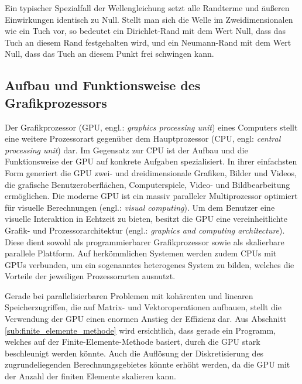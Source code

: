 \documentclass[crop=false]{standalone}
\begin{document}
        Ein typischer Spezialfall der Wellengleichung setzt alle Randterme und äußeren Einwirkungen identisch zu Null.
        Stellt man sich die Welle im Zweidimensionalen wie ein Tuch vor, so bedeutet ein Dirichlet-Rand mit dem Wert Null, dass das Tuch an diesem Rand festgehalten wird, und ein Neumann-Rand mit dem Wert Null, dass das Tuch an diesem Punkt frei schwingen kann.


    \subsection{Aufbau und Funktionsweise des Grafikprozessors} %
    \label{sub:aufbau_und_funktionsweise_des_grafikprozessors}
      Der Grafikprozessor (GPU, engl.: \textit{graphics processing unit}) eines Computers stellt eine weitere Prozessorart gegenüber dem Hauptprozessor (CPU, engl: \textit{central processing unit}) dar.
      Im Gegensatz zur CPU ist der Aufbau und die Funktionsweise der GPU auf konkrete Aufgaben spezialisiert.
      In ihrer einfachsten Form generiert die GPU zwei- und dreidimensionale Grafiken, Bilder und Videos, die grafische Benutzeroberflächen, Computerspiele, Video- und Bildbearbeitung ermöglichen.
      Die moderne GPU ist ein massiv paralleler Multiprozessor optimiert für visuelle Berechnungen (engl.: \textit{visual computing}).
      Um dem Benutzer eine visuelle Interaktion in Echtzeit zu bieten, besitzt die GPU eine vereinheitlichte Grafik- und Prozessorarchitektur (engl.: \textit{graphics and computing architecture}).
      Diese dient sowohl als programmierbarer Grafikprozessor sowie als skalierbare parallele Plattform.
      Auf herkömmlichen Systemen werden zudem CPUs mit GPUs verbunden, um ein sogenanntes heterogenes System zu bilden, welches die Vorteile der jeweiligen Prozessorarten ausnutzt.
      \cite[S.~A3]{Patterson2011}

      Gerade bei parallelisierbaren Problemen mit kohärenten und linearen Speicherzugriffen, die auf Matrix- und Vektoroperationen aufbauen, stellt die Verwendung der GPU einen enormen Anstieg der Effizienz dar.
      Aus Abschnitt \ref{sub:finite_elemente_methode} wird ersichtlich, dass gerade ein Programm, welches auf der Finite-Elemente-Methode basiert, durch die GPU stark beschleunigt werden könnte.
      Auch die Auflösung der Diskretisierung des zugrundeliegenden Berechnungsgebietes könnte erhöht werden, da die GPU mit der Anzahl der finiten Elemente skalieren kann.
\end{document}

